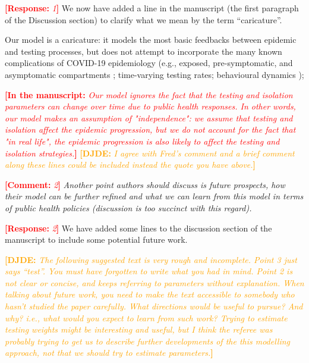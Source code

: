 \documentclass[12pt]{article}
\newcommand{\comment}{\showcomment}
\newcommand{\showcomment}[3]{\textcolor{#1}{\textbf{[#2: }\textsl{#3}\textbf{]}}}
\DeclareRobustCommand\_{\ifmmode\expandafter\subtxt\else\textunderscore\fi}
\newcommand{\david}[1]{\comment{orange}{DJDE}{#1}}
\newcommand{\com}[1]{\comment{red}{Comment}{#1}} %
\newcommand{\res}[1]{\comment{red}{Response}{#1}} %
\newcommand{\rev}[1]{\comment{red}{In the manuscript}{#1}} %
\begin{document}
\res 1
We now have added a line in the manuscript (the first paragraph of the Discussion section) to clarify what we mean by the term ``caricature''. 

Our model is a caricature: it models the most basic feedbacks between epidemic and testing processes, but does not attempt to incorporate the many known complications of COVID-19 epidemiology (e.g., exposed, pre-symptomatic, and asymptomatic compartments \citep{kain2021chopping}; time-varying testing rates; behavioural dynamics \citep{weitz2020awareness}); 

\rev{Our model ignores the fact that the testing and isolation parameters can change over time due to public health responses. In other words, our model makes an assumption of "independence": we assume that testing and isolation affect the epidemic progression, but we do not account for the fact that "in real life", the epidemic progression is also likely to affect the testing and isolation strategies.} 
\david{I agree with Fred's comment and a brief comment along these lines could be included instead the quote you have above.}

\com 2 
{\it Another point authors should discuss is future prospects, how their model can be further refined and what we can learn from this model in terms of public health policies (discussion is too succinct with this regard).}

\res 2
We have added some lines to the discussion section of the manuscript to include some potential future work.

\david{The following suggested text is very rough and incomplete.  Point 3 just says ``test''.  You must have forgotten to write what you had in mind.  Point 2 is not clear or concise, and keeps referring to parameters without explanation.  When talking about future work, you need to make the text accessible to somebody who hasn't studied the paper carefully.  What directions would be useful to pursue? And why? i.e., what would you expect to learn from such work?  Trying to estimate testing weights might be interesting and useful, but I think the referee was probably trying to get us to describe further developments of the this modelling approach, not that we should try to estimate parameters.}
\end{document}
